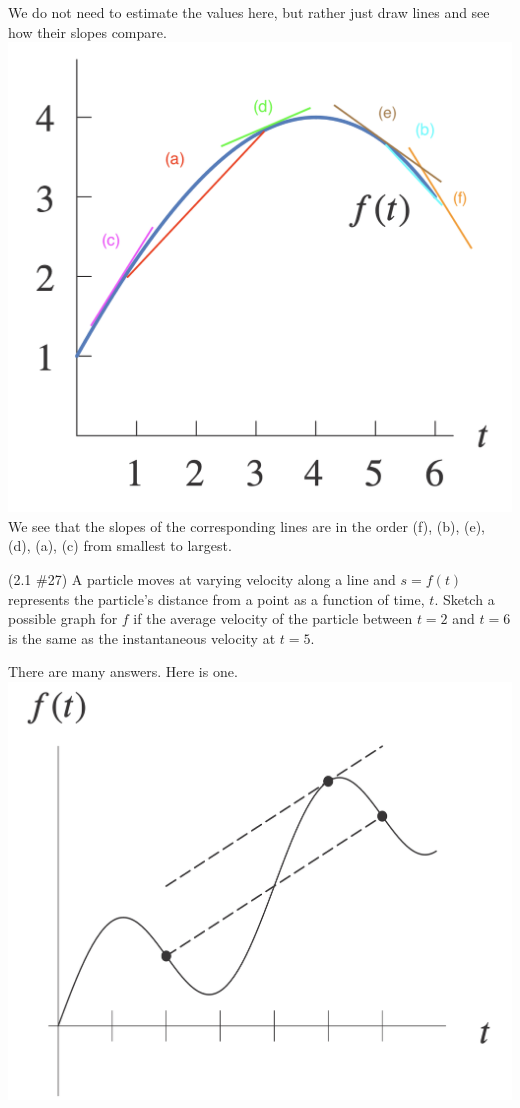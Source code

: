 \documentclass[11pt]{exam}
\begin{document}
\begin{questions}
  \begin{solution}
    We do not need to estimate the values here, but rather just draw
    lines and see how their slopes compare.\\
    \includegraphics[scale=0.5]{Figures/no24graph_with_lines.png}\\
    We see that the slopes of the corresponding lines are in the order
    (f), (b), (e), (d), (a), (c) from smallest to largest.
 \end{solution}
  \question (2.1 \#27)
  A particle moves at varying velocity along a line and \(s=f(t)\)
  represents the particle's distance from a point as a function of
  time, \(t\). Sketch a possible graph for \(f\) if the average
  velocity of the particle between \(t=2\) and \(t=6\) is the same as
  the instantaneous velocity at \(t=5\).
  \begin{solution}
    There are many answers. Here is one.\\
    \includegraphics[scale=0.4]{Figures/no27answer.png}

\end{solution}
\end{questions}
\end{document}
